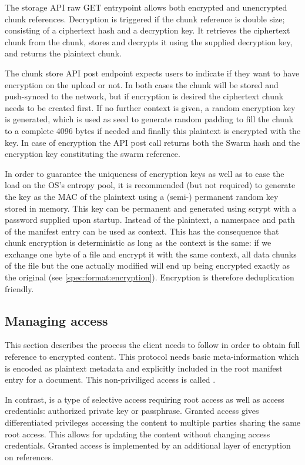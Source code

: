 The storage API raw GET entrypoint allows both encrypted and unencrypted chunk  references. 
Decryption is  triggered if the chunk reference is double size; consisting of a ciphertext hash and a decryption key.  It retrieves the ciphertext chunk from the chunk,  stores and decrypts it using the supplied decryption key, and returns the plaintext chunk.

The chunk store API post endpoint expects users to indicate if they want to have encryption on the upload or not. In both cases the chunk will be stored and push-synced to the network, but if encryption is desired the ciphertext chunk needs to be created first. If no further context is given, a random encryption key is generated, which is used as seed to generate random padding to fill the chunk to a complete 4096 bytes if needed and finally this plaintext is encrypted with the key. In case of encryption the API post call returns both the Swarm hash and the encryption key constituting the swarm reference. 

In order to guarantee the uniqueness of encryption keys as well as to ease the load on the OS's entropy pool, it is recommended (but not required) to generate the key as the MAC of the plaintext using a (semi-) permanent random key stored in memory. 
This key can be permanent and generated using scrypt with a password supplied upon startup. Instead   of the plaintext, a namespace and path of the manifest entry can be used as context.
This has the consequence that chunk encryption is deterministic as long as the context is the same: if we exchange one byte of a file and encrypt it with the same context, all data chunks of the file but the one actually modified will end up being encrypted exactly as the original (see \ref{spec:format:encryption}). Encryption is therefore deduplication friendly. 


\subsection{Managing access}\label{sec:managing-access}

This section describes the process the client needs to follow in order to obtain full reference to encrypted content. This protocol needs basic meta-information which is encoded as plaintext metadata and explicitly included in the root manifest entry for a document. This non-priviliged access is called .

In contrast,  is a type of selective access requiring root access as well as access credentials: authorized private key or passphrase. Granted access gives differentiated privileges accessing the content to multiple parties sharing the same root access. This allows for updating the content without changing access credentials. Granted access is implemented by an additional layer of encryption on references.

